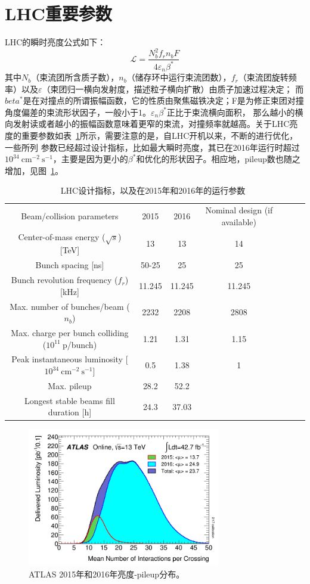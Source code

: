 \section{LHC重要参数}
LHC的瞬时亮度公式如下：
\begin{equation}
\mathcal{L}=\frac{N_{b}^{2}f_{r}n_{b}F}{4\varepsilon_{n}\beta^{*}}
\end{equation}
其中$N_b$（束流团所含质子数），$n_b$（储存环中运行束流团数），$f_{r}$（束流团旋转频率）以及$\varepsilon$（束团归一横向发射度，描述粒子横向扩散）由质子加速过程决定；
而$beta^{*}$是在对撞点的所谓振幅函数，它的性质由聚焦磁铁决定；F是为修正束团对撞角度偏差的束流形状因子，一般小于1。$\varepsilon_{n}\beta^{*}$正比于束流横向面积，
那么越小的横向发射读或者越小的振幅函数意味着更窄的束流，对撞频率就越高。关于LHC亮度的重要参数如表~\ref{tab:lhc_run_summary}所示，需要注意的是，自LHC开机以来，不断的进行优化，一些所列
参数已经超过设计指标，比如最大瞬时亮度，其已在2016年运行时超过$10^{34}~\text{cm}^{-2}~\text{s}^{-1}$，主要是因为更小的$\beta^{*}$和优化的形状因子。相应地，pileup数也随之增加，见图~\ref{fig:mu_2015_2016}。
\begin{table}[h]
\centering
\begin{tabular}{ccccccc}
\hline
Beam/collision parameters    &2015       &2016  &Nominal design (if available)\\
Center-of-mass energy ($\sqrt{s}$) [TeV]     &13   &13    &14 \\
Bunch spacing [ns]   &50-25   &25    &25 \\
Bunch revolution frequency ($f_{r}$) [kHz]  &11.245  &11.245  &11.245 \\
Max. number of bunches/beam ($n_{b}$)   &2232    &2208    &2808  \\
Max. charge per bunch colliding ($10^{11}~$p/bunch) &1.21   &1.31   &1.15 \\
Peak instantaneous luminosity [$10^{34}~\text{cm}^{-2}~\text{s}^{-1}$]  &0.5  &1.38  &1  \\
Max. pileup  &28.2   &52.2   & \\
Longest stable beams fill duration [h]  &24.3 &37.03  & \\
\hline
\end{tabular}
\caption{LHC设计指标，以及在2015年和2016年的运行参数~\cite{LHC-Run-Summary}}
\label{tab:lhc_run_summary}
\end{table}

\begin{figure}[h]
\centering
\includegraphics[width = 0.75\textwidth]{fig/mu_2015_2016.png}
\caption{ATLAS 2015年和2016年亮度-pileup分布。}
\label{fig:mu_2015_2016}
\end{figure}
